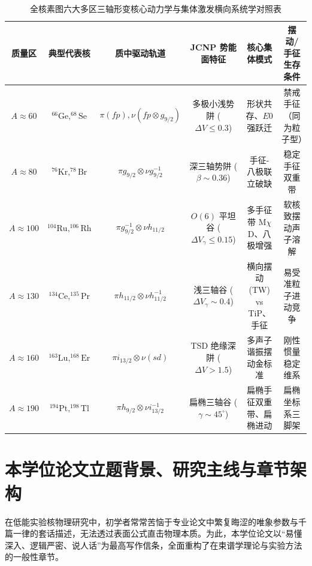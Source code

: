 \begin{table}[htbp]
    \centering
    \small
    \caption{全核素图六大多区三轴形变核心动力学与集体激发横向系统学对照表}
    \label{tab:cross_region_summary}
    \begin{tabular}{cccccc}
        \toprule
        质量区 & 典型代表核 & 质中驱动轨道 & JCNP 势能面特征 & 核心集体模式 & 摆动/手征生存条件 \\
        \midrule
        $A \approx 60$ & $^{66}\text{Ge}, ^{68}\text{Se}$ & $\pi(fp), \nu(fp \otimes g_{9/2})$ & 多极小浅势阱 ($\Delta V \le 0.3$) & 形状共存、$E0$ 强跃迁 & 禁戒手征（同为粒子型） \\
        $A \approx 80$ & $^{76}\text{Kr}, ^{78}\text{Br}$ & $\pi g_{9/2} \otimes \nu g_{9/2}^{-1}$ & 深三轴势阱 ($\beta \sim 0.36$) & 手征-八极联立破缺 & 稳定手征双重带 \\
        $A \approx 100$ & $^{104}\text{Ru}, ^{106}\text{Rh}$ & $\pi g_{9/2}^{-1} \otimes \nu h_{11/2}$ & $O(6)$ 平坦谷 ($\Delta V_\gamma \le 0.15$) & 多手征带 M$\chi$D、八极增强 & 软核致摆动声子溶解 \\
        $A \approx 130$ & $^{134}\text{Ce}, ^{135}\text{Pr}$ & $\pi h_{11/2} \otimes \nu h_{11/2}^{-1}$ & 浅三轴谷 ($\Delta V_\gamma \sim 0.4$) & 横向摆动 (TW) vs TiP、手征 & 易受准粒子进动竞争 \\
        $A \approx 160$ & $^{163}\text{Lu}, ^{168}\text{Er}$ & $\pi i_{13/2} \otimes \nu(sd)$ & TSD 绝缘深阱 ($\Delta V > 1.5$) & 多声子谐振摆动金标准 & 刚性惯量稳定维系 \\
        $A \approx 190$ & $^{194}\text{Pt}, ^{198}\text{Tl}$ & $\pi h_{9/2} \otimes \nu i_{13/2}^{-1}$ & 扁椭三轴谷 ($\gamma \sim 45^\circ$) & 扁椭手征双重带、扁椭进动 & 扁椭坐标系三脚架 \\
        \bottomrule
    \end{tabular}
\end{table}

\section{本学位论文立题背景、研究主线与章节架构}
\label{sec:thesis_outline}

在低能实验核物理研究中，初学者常常苦恼于专业论文中繁复晦涩的唯象参数与千篇一律的套话描述，无法透过表面公式直击物理本质。为此，本学位论文以“易懂深入、逻辑严密、说人话”为最高写作信条，全面重构了在束谱学理论与实验方法的一般性章节。


